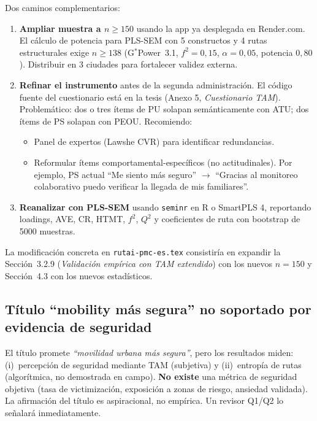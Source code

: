 \documentclass[11pt,a4paper]{article}
\begin{document}
\begin{abordaje}
Dos caminos complementarios:

\begin{enumerate}
  \item \textbf{Ampliar muestra a $n\geq 150$} usando la app ya desplegada en Render.com. El c\'alculo de potencia para PLS-SEM con 5 constructos y 4 rutas estructurales exige $n\geq 138$ (G$^*$Power~3.1, $f^2=0{,}15$, $\alpha=0{,}05$, potencia $0{,}80$). Distribuir en 3 ciudades para fortalecer validez externa.
  \item \textbf{Refinar el instrumento} antes de la segunda administraci\'on. El c\'odigo fuente del cuestionario est\'a en la tesis (Anexo 5, \emph{Cuestionario TAM}). Problem\'atico: dos o tres \'items de PU solapan sem\'anticamente con ATU; dos \'items de PS solapan con PEOU. Recomiendo:
  \begin{itemize}
    \item Panel de expertos (Lawshe CVR) para identificar redundancias.
    \item Reformular \'items comportamental-espec\'ificos (no actitudinales). Por ejemplo, PS actual ``Me siento m\'as seguro'' $\to$ ``Gracias al monitoreo colaborativo puedo verificar la llegada de mis familiares''.
  \end{itemize}
  \item \textbf{Reanalizar con PLS-SEM} usando \texttt{seminr} en R o SmartPLS 4, reportando loadings, AVE, CR, HTMT, $f^2$, $Q^2$ y coeficientes de ruta con bootstrap de 5000 muestras.
\end{enumerate}

La modificaci\'on concreta en \texttt{rutai-pmc-es.tex} consistir\'ia en expandir la Secci\'on~3.2.9 (\emph{Validaci\'on emp\'irica con TAM extendido}) con los nuevos $n=150$ y Secci\'on~4.3 con los nuevos estad\'isticos.
\end{abordaje}

\subsection{T\'itulo ``mobility m\'as segura'' no soportado por evidencia de seguridad}

\begin{deficiencia}[B.4 --- Deficiencia]
El t\'itulo promete \emph{``movilidad urbana m\'as segura''}, pero los resultados miden: (i)~percepci\'on de seguridad mediante TAM (subjetiva) y (ii)~entrop\'ia de rutas (algor\'itmica, no demostrada en campo). \textbf{No existe} una m\'etrica de seguridad objetiva (tasa de victimizaci\'on, exposici\'on a zonas de riesgo, ansiedad validada). La afirmaci\'on del t\'itulo es aspiracional, no emp\'irica. Un revisor Q1/Q2 lo se\~nalar\'a inmediatamente.
\end{deficiencia}
\end{document}
